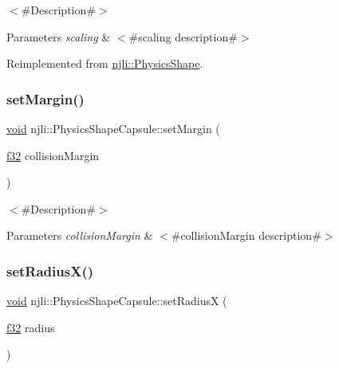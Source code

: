 $<$\#\+Description\#$>$


\begin{DoxyParams}{Parameters}
{\em scaling} & $<$\#scaling description\#$>$ \\
\hline
\end{DoxyParams}


Reimplemented from \mbox{\hyperlink{classnjli_1_1_physics_shape_afd2f02f3fd7ab5c1b48f445f2831f18f}{njli\+::\+Physics\+Shape}}.

\mbox{\label{classnjli_1_1_physics_shape_capsule_a376aed4ab15cbc18e30b4ebd65c6f864}} 
\subsubsection{\texorpdfstring{set\+Margin()}{setMargin()}}
{\footnotesize\ttfamily \mbox{\hyperlink{_thread_8h_af1e856da2e658414cb2456cb6f7ebc66}{void}} njli\+::\+Physics\+Shape\+Capsule\+::set\+Margin (\begin{DoxyParamCaption}\item[{\mbox{\hyperlink{_util_8h_a5f6906312a689f27d70e9d086649d3fd}{f32}}}]{collision\+Margin }\end{DoxyParamCaption})}

$<$\#\+Description\#$>$


\begin{DoxyParams}{Parameters}
{\em collision\+Margin} & $<$\#collision\+Margin description\#$>$ \\
\hline
\end{DoxyParams}
\mbox{\label{classnjli_1_1_physics_shape_capsule_a17194d0ea8151feb0b6faf0b39842bdb}} 
\subsubsection{\texorpdfstring{set\+Radius\+X()}{setRadiusX()}}
{\footnotesize\ttfamily \mbox{\hyperlink{_thread_8h_af1e856da2e658414cb2456cb6f7ebc66}{void}} njli\+::\+Physics\+Shape\+Capsule\+::set\+RadiusX (\begin{DoxyParamCaption}\item[{\mbox{\hyperlink{_util_8h_a5f6906312a689f27d70e9d086649d3fd}{f32}}}]{radius }\end{DoxyParamCaption})}

